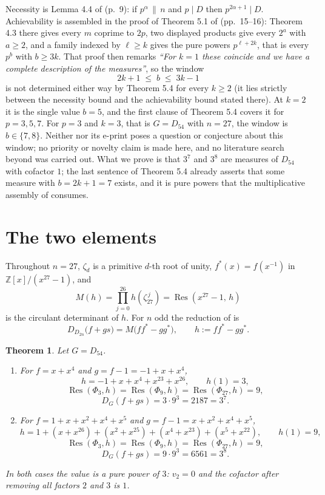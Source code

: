 \documentclass[11pt]{amsart}
\newtheorem{theorem}{Theorem}
\theoremstyle{remark}
\DeclareMathOperator{\Res}{Res}
\newcommand{\ZZ}{\mathbb Z}
\begin{document}
Necessity is Lemma 4.4 of \cite{BP} (p.~9): if $p^\alpha\,\|\,n$ and $p\mid D$
then $p^{2\alpha+1}\mid D$. Achievability is assembled in the proof of Theorem
5.1 of \cite{BP} (pp.~15--16): Theorem 4.3 there gives every $m$ coprime to
$2p$, two displayed products give every $2^a$ with $a\ge2$, and a family indexed
by $\ell\ge k$ gives the pure powers $p^{\ell+2k}$, that is every $p^b$ with
$b\ge3k$. That proof then remarks \emph{``For $k=1$ these coincide and we have a
complete description of the measures''}, so the window
\[
 2k+1\;\le\;b\;\le\;3k-1
\]
is not determined either way by Theorem 5.4 for every $k\ge2$ (it lies strictly
between the necessity bound and the achievability bound stated there). At $k=2$ it is the single
value $b=5$, and the first clause of Theorem 5.4 covers it for $p=3,5,7$. For
$p=3$ and $k=3$, that is $G=D_{54}$ with $n=27$, the window is $b\in\{7,8\}$.
Neither \cite{BP} nor its e-print poses a question or conjecture about this
window; no priority or novelty claim is made here, and no literature search
beyond \cite{BP} was carried out. What we prove is that $3^7$ and $3^8$ are
measures of $D_{54}$ with cofactor $1$; the last sentence of Theorem 5.4
already asserts that some measure with $b=2k+1=7$ exists, and it is pure powers
that the multiplicative assembly of \cite{BP} consumes.



\section{The two elements}

Throughout $n=27$, $\zeta_d$ is a primitive $d$-th root of unity,
$f^*(x)=f(x^{-1})$ in $\ZZ[x]/(x^{27}-1)$, and
\[
 M(h)=\prod_{j=0}^{26}h(\zeta_{27}^{\,j})=\Res(x^{27}-1,\,h)
\]
is the circulant determinant of $h$. For $n$ odd the reduction of \cite{BP} is
\begin{equation}\label{eq:red}
 D_{D_{2n}}\bigl(f+gs\bigr)=M\bigl(f f^*-g g^*\bigr),
 \qquad h:=f f^*-g g^*.
\end{equation}

\begin{theorem}\label{thm:main}
Let $G=D_{54}$.
\begin{enumerate}
\item[\textup{(W1)}] For $f=x+x^4$ and $g=f-1=-1+x+x^4$,
\[
 h=-1+x+x^4+x^{23}+x^{26},\qquad h(1)=3,
\]
\[
 \Res(\Phi_3,h)=\Res(\Phi_9,h)=\Res(\Phi_{27},h)=9,
\]
\[
 D_G(f+gs)=3\cdot9^3=2187=3^7 .
\]
\item[\textup{(W2)}] For $f=1+x+x^2+x^4+x^5$ and $g=f-1=x+x^2+x^4+x^5$,
\[
 h=1+(x+x^{26})+(x^2+x^{25})+(x^4+x^{23})+(x^5+x^{22}),\qquad h(1)=9,
\]
\[
 \Res(\Phi_3,h)=\Res(\Phi_9,h)=\Res(\Phi_{27},h)=9,
\]
\[
 D_G(f+gs)=9\cdot9^3=6561=3^8 .
\]
\end{enumerate}
In both cases the value is a \emph{pure} power of $3$: $v_2=0$ and the cofactor
after removing all factors $2$ and $3$ is $1$.
\end{theorem}
\end{document}

